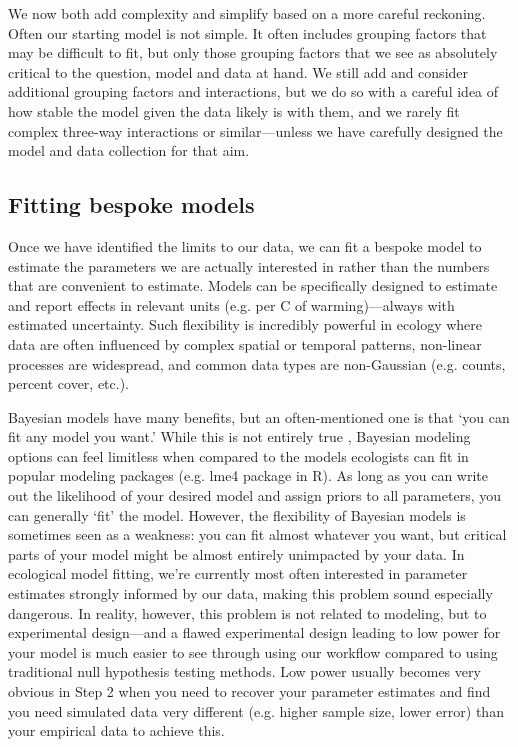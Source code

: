 \documentclass[11pt]{article}
\begin{document}
We now both add complexity and simplify based on a more careful reckoning. Often our starting model is not simple.  It often includes grouping factors that may be difficult to fit, but only those grouping factors that we see as absolutely critical to the question, model and data at hand. We still add and consider additional grouping factors and interactions, but we do so with a careful idea of how stable the model given the data likely is with them, and we rarely fit complex three-way interactions or similar---unless we have carefully designed the model and data collection for that aim. %

 \subsection*{Fitting bespoke models} 
Once we have identified the limits to our data, we can fit a bespoke model to estimate the parameters we are actually interested in rather than the numbers that are convenient to estimate. Models can be specifically designed to estimate and report effects in relevant units (e.g. per \degree C of warming)---always with estimated uncertainty. Such flexibility is incredibly powerful in ecology where data are often influenced by complex spatial or temporal patterns, non-linear processes are widespread, and common data types are non-Gaussian (e.g. counts, percent cover, etc.). 

Bayesian models have many benefits, but an often-mentioned one is that `you can fit any model you want.' While this is not entirely true \citep{BDA,reid2019}, Bayesian modeling options can feel limitless when compared to the models ecologists can fit in popular modeling packages (e.g. \textsf{lme4} package in \textsf{R}). As long as you can write out the likelihood of your desired model \citep[and sometimes even if you can't,][]{Sunnaaker2013} and assign priors to all parameters, you can generally `fit' the model. However, the flexibility of Bayesian models is sometimes seen as a weakness: you can fit almost whatever you want, but critical parts of your model might be almost entirely unimpacted by your data. In ecological model fitting, we're currently most often interested in parameter estimates strongly informed by our data, making this problem sound especially dangerous. In reality, however, this problem is not related to modeling, but to experimental design---and a flawed experimental design leading to low power for your model is much easier to see through using our workflow compared to using traditional null hypothesis testing methods. Low power usually becomes very obvious in Step 2 when you need to recover your parameter estimates and find you need simulated data very different (e.g. higher sample size, lower error) than your empirical data to achieve this.
\end{document}
